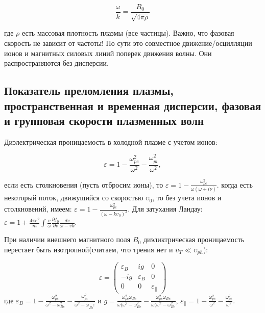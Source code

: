 \documentclass[10pt, a4paper]{article}
\begin{document}
\begin{equation}
    \frac{\omega}{k}=\frac{B_0}{\sqrt{4\pi \rho}}
\end{equation}

где $\rho$ есть массовая плотность плазмы (все частицы). Важно, что фазовая скорость не зависит от частоты! По сути это совместное движение/осцилляции ионов и магнитных силовых линий поперек движения волны. Они распространяются без дисперсии.

\subsection{Показатель преломления плазмы, пространственная и временная дисперсии, фазовая и групповая скорости плазменных волн}

Диэлектрическая проницаемость в холодной плазме с учетом ионов:

\begin{equation}
    \varepsilon=1 - \frac{\omega_{pe}^2}{\omega^2} - \frac{\omega_{pi}^2}{\omega^2},
\end{equation}

если есть столкновения (пусть отбросим ионы), то $\varepsilon=1-\frac{\omega_{pe}^2}{\omega (\omega+i \nu)}$. когда есть некоторый поток, движущийся со скоростью $\upsilon_0$, то без учета ионов и столкновений, имеем: $\varepsilon=1-\frac{\omega_{pe}^2}{(\omega - k \upsilon_0)^2}$.
Для затухания Ландау: $\varepsilon=1+\frac{4\pi e^2}{m} \int \frac{v}{\omega} \frac{\partial f_0}{\partial v} \frac{dv}{\omega-vk}$.

При наличии внешнего магнитного поля $B_0$ диэликтрическая проницаемость перестает быть изотропной(считаем, что трения нет и $\upsilon_T \ll \upsilon_{ph}$):

\begin{equation}
    \varepsilon=
    \begin{pmatrix}
        \varepsilon_B & ig & 0 \\
        -ig & \varepsilon_B & 0 \\
        0 & 0 & \varepsilon_{\parallel}
    \end{pmatrix}
\end{equation}
 где $\varepsilon_B=1-\frac{\omega_{pe}^2}{\omega^2-\omega_{Be}^2}-\frac{\omega_{pi}^2}{\omega^2-\omega_{Bi^2}}$ и $g=\frac{\omega_{pe}^2 \omega_{Be}}{\omega (\omega^2-\omega_{Be}^2} -\frac{\omega_{pe}^2 \omega_{Be}}{\omega (\omega^2-\omega_{Be}^2}$, $\varepsilon_{\parallel}=1-\frac{\omega_{pe}^2}{\omega^2}-\frac{\omega_{pe}^2}{\omega^2}$. 
\end{document}
